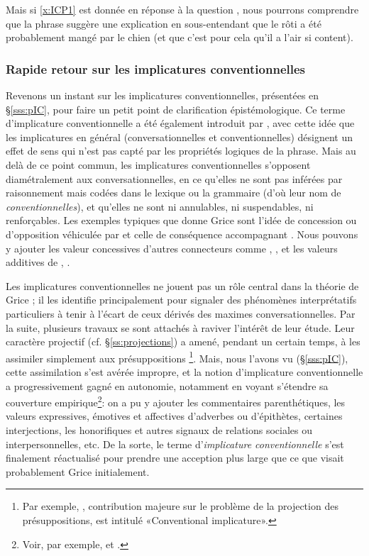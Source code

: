 \begin{refsegment}
Mais si \ref{x:ICP1} est donnée en réponse à la question , nous pourrons comprendre que la phrase suggère une explication en sous-entendant que le rôti a été probablement mangé par le chien (et que c'est pour cela qu'il a l'air si content).

\subsubsection{Rapide retour sur les implicatures conventionnelles}
\label{sss:ICbis}

\sloppy

Revenons un instant sur les implicatures conventionnelles, présentées en \S\ref{sss:pIC}, pour faire un petit point de clarification épistémologique.  
Ce terme d'implicature conventionnelle a été également introduit par \citet{Grc:75}, avec cette idée que les implicatures en général (conversationnelles et conventionnelles) désignent un effet de sens qui n'est pas capté par les propriétés logiques de la phrase.  
Mais au delà de ce point commun, les implicatures conventionnelles s'opposent diamétralement aux conversationnelles, en ce qu'elles ne sont pas inférées par raisonnement mais codées dans le lexique ou la grammaire (d'où leur nom de \emph{conventionnelles}), et qu'elles ne sont ni annulables, ni suspendables, ni renforçables.  
Les exemples typiques %
que donne Grice sont l'idée de concession ou d'opposition véhiculée par  et celle de conséquence accompagnant .  
Nous pouvons y ajouter les valeur concessives d'autres connecteurs comme , , et les valeurs additives de , .

\fussy

Les implicatures conventionnelles ne jouent pas un rôle central dans la théorie de Grice ; il les identifie principalement pour signaler des phénomènes interprétatifs particuliers à tenir à l'écart de ceux dérivés des maximes conversationnelles.
Par la suite, plusieurs travaux se sont attachés à raviver l'intérêt de leur étude.  Leur caractère projectif (cf. \S\ref{ss:projections}) a amené, pendant un certain temps, à les assimiler simplement aux présuppositions%
\footnote{Par exemple, \citet{KartPet:79}, contribution majeure sur le problème de la projection des présuppositions, est intitulé «Conventional implicature».}.
 Mais, nous l'avons vu (\S\ref{sss:pIC}), cette assimilation s'est avérée impropre, et la notion d'implicature conventionnelle a progressivement gagné en autonomie, notamment en voyant s'étendre sa couverture empirique\footnote{Voir, par exemple, \citet[127--132]{Levinson:83} et \citet[chap.~2]{Potts:05}.}: on a pu y ajouter les commentaires parenthétiques, les  valeurs expressives, émotives et affectives  d'adverbes ou d'épithètes, certaines interjections, les honorifiques et autres signaux de relations sociales ou interpersonnelles, etc.
De la sorte, le terme d'\emph{implicature conventionnelle} s'est finalement réactualisé pour prendre une acception plus large que ce que visait  probablement Grice initialement. 



\end{refsegment}
